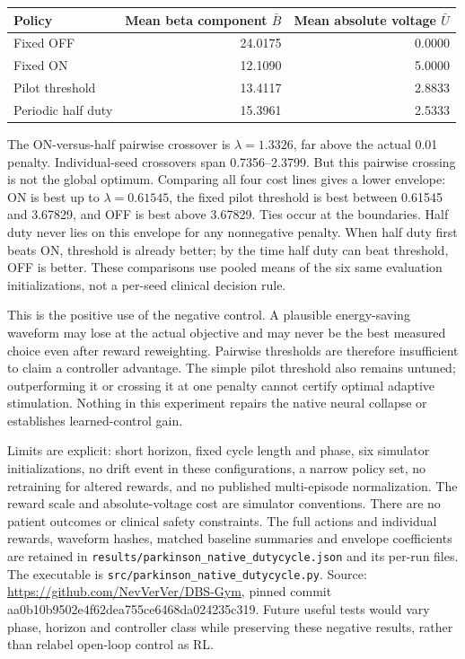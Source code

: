 \begin{center}\begin{tabular}{lrr}\hline
Policy & Mean beta component $\bar B$ & Mean absolute voltage $\bar U$\\\hline
Fixed OFF & 24.0175 & 0.0000\\
Fixed ON & 12.1090 & 5.0000\\
Pilot threshold & 13.4117 & 2.8833\\
Periodic half duty & 15.3961 & 2.5333\\\hline
\end{tabular}\end{center}

The ON-versus-half pairwise crossover is $\lambda=1.3326$, far above the actual 0.01 penalty. Individual-seed crossovers span 0.7356--2.3799. But this pairwise crossing is not the global optimum. Comparing all four cost lines gives a lower envelope: ON is best up to $\lambda=0.61545$, the fixed pilot threshold is best between 0.61545 and 3.67829, and OFF is best above 3.67829. Ties occur at the boundaries. Half duty never lies on this envelope for any nonnegative penalty. When half duty first beats ON, threshold is already better; by the time half duty can beat threshold, OFF is better. These comparisons use pooled means of the six same evaluation initializations, not a per-seed clinical decision rule.

This is the positive use of the negative control. A plausible energy-saving waveform may lose at the actual objective and may never be the best measured choice even after reward reweighting. Pairwise thresholds are therefore insufficient to claim a controller advantage. The simple pilot threshold also remains untuned; outperforming it or crossing it at one penalty cannot certify optimal adaptive stimulation. Nothing in this experiment repairs the native neural collapse or establishes learned-control gain.

Limits are explicit: short horizon, fixed cycle length and phase, six simulator initializations, no drift event in these configurations, a narrow policy set, no retraining for altered rewards, and no published multi-episode normalization. The reward scale and absolute-voltage cost are simulator conventions. There are no patient outcomes or clinical safety constraints. The full actions and individual rewards, waveform hashes, matched baseline summaries and envelope coefficients are retained in \texttt{results/parkinson\_native\_dutycycle.json} and its per-run files. The executable is \texttt{src/parkinson\_native\_dutycycle.py}. Source: \url{https://github.com/NevVerVer/DBS-Gym}, pinned commit aa0b10b9502e4f62dea755ce6468da024235c319. Future useful tests would vary phase, horizon and controller class while preserving these negative results, rather than relabel open-loop control as RL.
